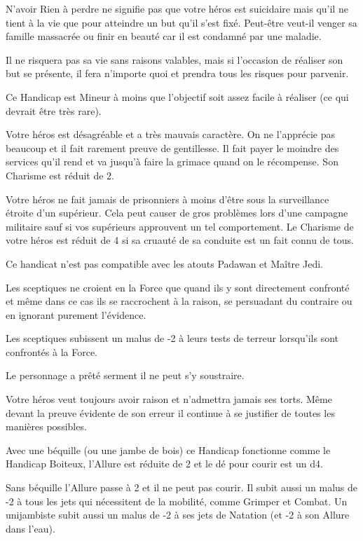 \begin{description}[align=left]
    \item [Rien à perdre (Mineur)]
        N’avoir Rien à perdre ne signifie pas que votre héros est suicidaire mais qu'il ne tient à la vie que pour atteindre un but qu'il s'est fixé. Peut-être veut-il venger sa famille massacrée ou finir en beauté car il est condamné par une maladie.

        Il ne risquera pas sa vie sans raisons valables, mais si l'occasion de réaliser son but se présente, il fera n'importe quoi et prendra tous les risques pour parvenir. 

        Ce Handicap est Mineur à moins que l'objectif soit assez facile à réaliser (ce qui devrait être très rare).

    \item [Sale caractère (Mineur)]
        Votre héros est désagréable et a très mauvais caractère. On ne l'apprécie pas beaucoup et il fait rarement preuve de gentillesse. Il fait payer le moindre des services qu'il rend et va jusqu'à faire la grimace quand on le récompense. Son Charisme est réduit de 2.

    \item [Sanguinaire (Majeur)]
        Votre héros ne fait jamais de prisonniers à moins d'être sous la surveillance étroite d'un supérieur. Cela peut causer de gros problèmes lors d'une campagne militaire sauf si vos supérieurs approuvent un tel comportement. Le Charisme de votre héros est réduit de 4 si sa cruauté de sa conduite est un fait connu de tous.

        Ce handicat n'est pas compatible avec les atouts Padawan et Maître Jedi.

    \item [Sceptique (Mineur)]
        Les sceptiques ne croient en la Force que quand ils y sont directement confronté et même dans ce cas ils se raccrochent à la raison, se persuadant du contraire ou en ignorant purement l'évidence.

        Les sceptiques subissent un malus de -2 à leurs tests de terreur lorsqu'ils sont confrontés à la Force.

    \item [Serment (Jedi ou Sith) (Majeur)]
        Le personnage a prêté serment il ne peut s'y soustraire.

    \item [Têtu (Mineur)]
        Votre héros veut toujours avoir raison et n'admettra jamais ses torts. Même devant la preuve évidente de son erreur il continue à se justifier de toutes les manières possibles.

    \item [Unijambiste (Majeur)]
        Avec une béquille (ou une jambe de bois) ce Handicap fonctionne comme le Handicap Boiteux, l'Allure est réduite de 2 et le dé pour courir est un d4.

        Sans béquille l'Allure passe à 2 et il ne peut pas courir. Il subit aussi un malus de -2 à tous les jets qui nécessitent de la mobilité, comme Grimper et Combat. Un unijambiste subit aussi un malus de -2 à ses jets de Natation (et -2 à son Allure dans l'eau).

\end{description}

